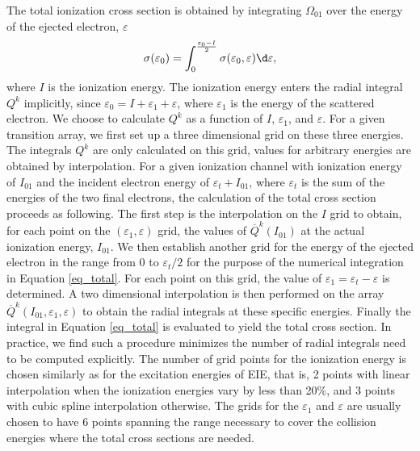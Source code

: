 \documentclass{elsart}
\begin{document}
The total ionization cross section is obtained by integrating $\Omega_{01}$
over the energy of the ejected electron, $\varepsilon$
\begin{equation}
\label{eq_total}
\sigma(\varepsilon_0) = \int\nolimits_0^{\frac{\varepsilon_0-I}{2}}
\sigma(\varepsilon_0,\varepsilon) \d\varepsilon,
\end{equation}
where $I$ is the ionization energy. The ionization energy enters the
radial integral $Q^k$ implicitly, since $\varepsilon_0 =
I+\varepsilon_1+\varepsilon$, where $\varepsilon_1$ is the energy of the
scattered electron. We choose to calculate $Q^k$ as a function of $I$,
$\varepsilon_1$, and $\varepsilon$. For a given transition array, we first set
up a three dimensional grid on these three energies. The integrals $Q^k$ are 
only calculated on this grid, values for arbitrary energies are obtained by
interpolation. For a given ionization channel with
ionization energy of $I_{01}$ and the incident electron energy of
$\varepsilon_t + I_{01}$, where $\varepsilon_t$ is the sum of the energies of
the two final electrons, the calculation of the total cross section proceeds as
following. The first step is the interpolation on the $I$ grid to obtain, for
each point on the $(\varepsilon_1,\varepsilon)$ grid, the values of
$\overline{Q}^k(I_{01})$ at the actual ionization energy, $I_{01}$. We then
establish another grid for the energy of the ejected electron in the range 
from 0 to $\varepsilon_t/2$ for the purpose of the numerical integration in
Equation \ref{eq_total}. For each 
point on this grid, the value of $\varepsilon_1 = \varepsilon_t-\varepsilon$
is determined. A two dimensional interpolation is then performed on the array
$\overline{Q}^k(I_{01},\varepsilon_1,\varepsilon)$ to obtain the radial
integrals at these specific 
energies. Finally the integral in Equation \ref{eq_total} is evaluated to
yield the total cross section. In practice, we find such a procedure
minimizes the number of radial integrals need to be computed explicitly. The
number of grid points for the ionization energy is chosen similarly as for the
excitation energies of EIE, that is, 2 points with linear interpolation when
the ionization energies vary by less than 20\%, and 3 points with cubic spline
interpolation otherwise. The grids for the $\varepsilon_1$ and $\varepsilon$
are usually chosen to have 6 points spanning the range necessary to cover the
collision energies where the total cross sections are needed.
\end{document}
